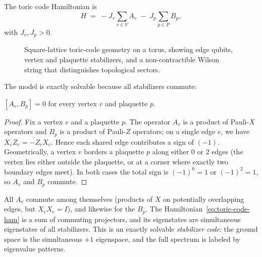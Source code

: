 \begin{definition}\label{def:toric-code-ham}
The toric code Hamiltonian is
\begin{equation}\label{eq:toric-code-ham}
    H \;=\; -J_v \sum_{v \in V} A_v \;-\; J_p \sum_{p \in P} B_p,
\end{equation}
with $J_v, J_p > 0$.
\end{definition}

\begin{figure}[h]
    \centering
    
    \caption{Square-lattice toric-code geometry on a torus, showing edge qubits, vertex and plaquette stabilizers, and a non-contractible Wilson string that distinguishes topological sectors.}
    \label{fig:toric-code-lattice}
\end{figure}

The model is exactly solvable because all stabilizers commute:

\begin{proposition}\label{prop:stabilizer-commute}
$[A_v, B_p] = 0$ for every vertex $v$ and plaquette $p$.
\end{proposition}
\begin{proof}
Fix a vertex $v$ and a plaquette $p$.  The operator $A_v$ is a product of Pauli-$X$ operators and $B_p$ is a product of Pauli-$Z$ operators; on a single edge $e$, we have $X_e Z_e = -Z_e X_e$.  Hence each shared edge contributes a sign of $(-1)$.  Geometrically, a vertex $v$ borders a plaquette $p$ along either $0$ or $2$ edges (the vertex lies either outside the plaquette, or at a corner where exactly two boundary edges meet).  In both cases the total sign is $(-1)^0 = 1$ or $(-1)^2 = 1$, so $A_v$ and $B_p$ commute.
\end{proof}

\noindent All $A_v$ commute among themselves (products of $X$ on potentially overlapping edges, but $X_e X_e = I$), and likewise for the $B_p$.  The Hamiltonian~\eqref{eq:toric-code-ham} is a sum of commuting projectors, and its eigenstates are simultaneous eigenstates of all stabilizers.  This is an exactly solvable \emph{stabilizer code}: the ground space is the simultaneous $+1$ eigenspace, and the full spectrum is labeled by eigenvalue patterns.

